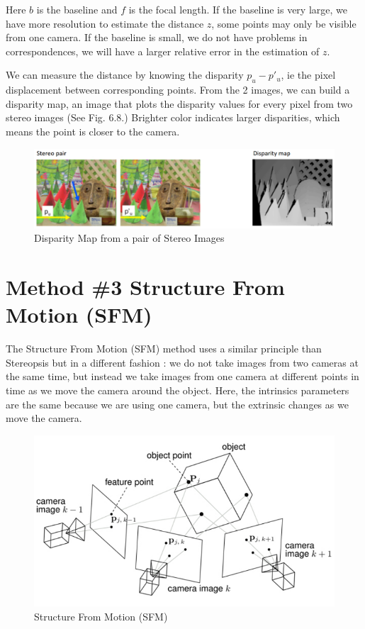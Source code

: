 \documentclass[twoside]{article}
\begin{document}
Here $b$ is the baseline and $f$ is the focal length. If the baseline is very large, we have more resolution to estimate the distance $z$, some points may only be visible from one camera. If the baseline is small, we do not have problems in correspondences, we will have a larger relative error in the estimation of $z$.

We can measure the distance by knowing the disparity $p_u-p'_u$, ie the pixel displacement between corresponding points. From the 2 images, we can build a disparity map, an image that plots the disparity values for every pixel from two stereo images (See Fig. 6.8.) Brighter color indicates larger disparities, which means the point is closer to the camera.

\begin{figure}[h!]
  \begin{center}
	\includegraphics[scale=0.5]{disparity_map.PNG}  \end{center}
  \caption{Disparity Map from a pair of Stereo Images} 
  \label{ex}
\end{figure}

\newpage
\section{Method \#3 Structure From Motion (SFM)}

The Structure From Motion (SFM) method uses a similar principle than Stereopsis but in a different fashion : we do not take images from two cameras at the same time, but instead we take images from one camera at different points in time as we move the camera around the object. Here, the intrinsics parameters are the same because we are using one camera, but the extrinsic changes as we move the camera.

\begin{figure}[h!]
  \begin{center}
	\includegraphics[scale=0.4]{SFM.PNG}  \end{center}
  \caption{Structure From Motion (SFM)} 
  \label{ex}
\end{figure}
\end{document}
